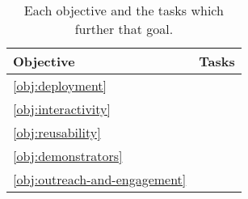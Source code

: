 \begin{table}
  \label{tab:objectives-tasks}
  \caption{
  Each objective and the tasks which further that goal.}
  \begin{tabular}{|m{}|m{}|}

    \hline

    \textbf{Objective} & \textbf{Tasks}
    \\\hline

    \ref{obj:deployment} &


    \\\hline

    \ref{obj:interactivity} &


    \\\hline

    \ref{obj:reusability} &


    \\\hline

    \ref{obj:demonstrators} &

    \\\hline

    \ref{obj:outreach-and-engagement} &


    \\\hline

  \end{tabular}
\end{table}
